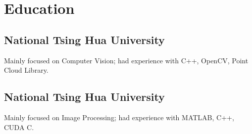 \documentclass[]{deedy-resume}
\begin{document}
\begin{minipage}[t]{0.32\textwidth}
\section{Education}

\subsection{National Tsing Hua University}
Mainly focused on Computer Vision; had experience with C++, OpenCV, Point Cloud Library.
\sectionsep

\subsection{National Tsing Hua University}
Mainly focused on Image Processing; had experience with MATLAB, C++, CUDA C.
\sectionsep

%
%
\end{minipage} 
\hfill
\end{document}
